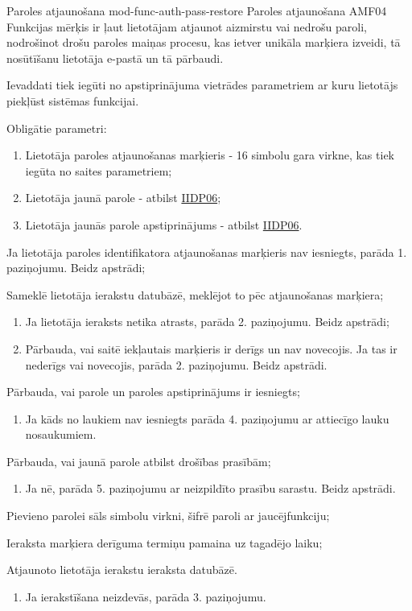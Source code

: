 \moduleFunctionTable
{Paroles atjaunošana}
{mod-func-auth-pass-restore}
{Paroles atjaunošana}
{AMF04}
{
	Funkcijas mērķis ir ļaut lietotājam atjaunot aizmirstu vai nedrošu paroli, nodrošinot drošu paroles maiņas procesu, kas ietver unikāla marķiera izveidi, tā nosūtīšanu lietotāja e-pastā un tā pārbaudi.
}
{
	Ievaddati tiek iegūti no apstiprinājuma vietrādes parametriem ar kuru lietotājs piekļūst sistēmas funkcijai.

	Obligātie parametri:
	\begin{enumerate}
		\item Lietotāja paroles atjaunošanas marķieris - 16 simbolu gara virkne, kas tiek iegūta no saites parametriem;
		\item Lietotāja jaunā parole - atbilst \hyperref[tab:IIDP06]{IIDP06};
		\item Lietotāja jaunās parole apstiprinājums - atbilst \hyperref[tab:IIDP06]{IIDP06}.
	\end{enumerate}
}
{
	\item Ja lietotāja paroles identifikatora atjaunošanas marķieris nav iesniegts, parāda 1. paziņojumu. Beidz apstrādi;
	\item Sameklē lietotāja ierakstu datubāzē, meklējot to pēc atjaunošanas marķiera;
	\begin{enumerate}
		\item Ja lietotāja ieraksts netika atrasts, parāda 2. paziņojumu. Beidz apstrādi;
		\item Pārbauda, vai saitē iekļautais marķieris ir derīgs un nav novecojis. Ja tas ir nederīgs vai novecojis, parāda 2. paziņojumu. Beidz apstrādi.
	\end{enumerate}
	\item Pārbauda, vai parole un paroles apstiprinājums ir iesniegts;
	\begin{enumerate}
		\item Ja kāds no laukiem nav iesniegts parāda 4. paziņojumu ar attiecīgo lauku nosaukumiem.
	\end{enumerate}
	\item Pārbauda, vai jaunā parole atbilst drošības prasībām;
	\begin{enumerate}
		\item Ja nē, parāda 5. paziņojumu ar neizpildīto prasību sarastu. Beidz apstrādi.
	\end{enumerate}
	\item Pievieno parolei sāls simbolu virkni, šifrē paroli ar jaucējfunkciju;
	\item Ieraksta marķiera derīguma termiņu pamaina uz tagadējo laiku;
	\item Atjaunoto lietotāja ierakstu ieraksta datubāzē.
	\begin{enumerate}
		\item Ja ierakstīšana neizdevās, parāda 3. paziņojumu.
	\end{enumerate}
}
